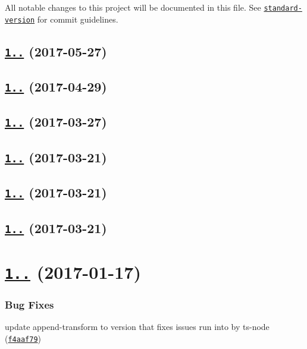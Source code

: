All notable changes to this project will be documented in this file. See \href{https://github.com/conventional-changelog/standard-version}{\tt standard-\/version} for commit guidelines.

\label{_1.0.7}%
 \subsection*{\href{https://github.com/istanbuljs/istanbuljs/compare/istanbul-lib-hook@1.0.6...istanbul-lib-hook@1.0.7}{\tt 1..} (2017-\/05-\/27)}

\label{_1.0.6}%
 \subsection*{\href{https://github.com/istanbuljs/istanbul-lib-hook/compare/istanbul-lib-hook@1.0.5...istanbul-lib-hook@1.0.6}{\tt 1..} (2017-\/04-\/29)}

\label{_1.0.5}%
 \subsection*{\href{https://github.com/istanbuljs/istanbul-lib-hook/compare/istanbul-lib-hook@1.0.4...istanbul-lib-hook@1.0.5}{\tt 1..} (2017-\/03-\/27)}

\label{_1.0.4}%
 \subsection*{\href{https://github.com/istanbuljs/istanbul-lib-hook/compare/istanbul-lib-hook@1.0.3...istanbul-lib-hook@1.0.4}{\tt 1..} (2017-\/03-\/21)}

\label{_1.0.3}%
 \subsection*{\href{https://github.com/istanbuljs/istanbul-lib-hook/compare/istanbul-lib-hook@1.0.2...istanbul-lib-hook@1.0.3}{\tt 1..} (2017-\/03-\/21)}

\label{_1.0.2}%
 \subsection*{\href{https://github.com/istanbuljs/istanbul-lib-hook/compare/istanbul-lib-hook@1.0.0...istanbul-lib-hook@1.0.2}{\tt 1..} (2017-\/03-\/21)}

\label{_1.0.0}%
 \section*{\href{https://github.com/istanbuljs/istanbul-lib-hook/compare/v1.0.0-alpha.3...v1.0.0}{\tt 1..} (2017-\/01-\/17)}

\subsubsection*{Bug Fixes}


\begin{DoxyItemize}
\item update append-\/transform to version that fixes issues run into by ts-\/node (\href{https://github.com/istanbuljs/istanbul-lib-hook/commit/f4aaf79}{\tt f4aaf79}) 
\end{DoxyItemize}